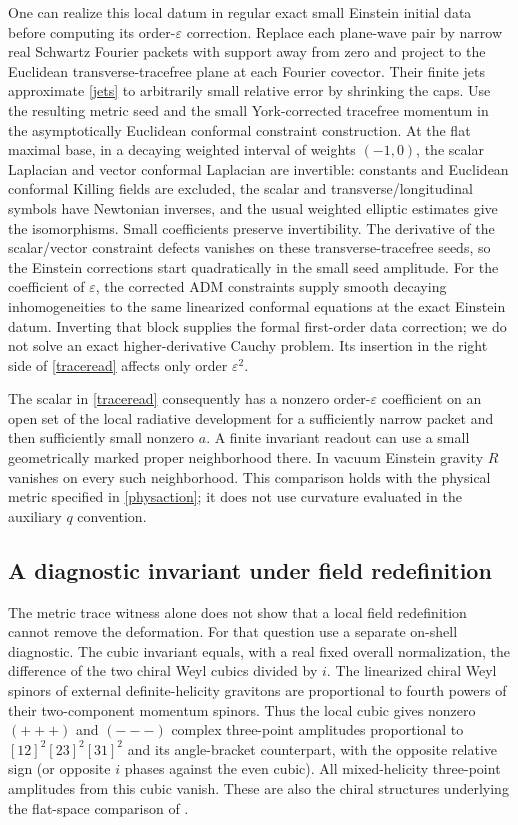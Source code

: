 \documentclass[11pt]{article}
\newcommand{\ep}{\varepsilon}
\begin{document}
One can realize this local datum in regular exact small Einstein initial data before computing its order-\(\ep\) correction. Replace each plane-wave pair by narrow real Schwartz Fourier packets with support away from zero and project to the Euclidean transverse-tracefree plane at each Fourier covector. Their finite jets approximate \eqref{jets} to arbitrarily small relative error by shrinking the caps. Use the resulting metric seed and the small York-corrected tracefree momentum in the asymptotically Euclidean conformal constraint construction. At the flat maximal base, in a decaying weighted interval of weights \((-1,0)\), the scalar Laplacian and vector conformal Laplacian are invertible: constants and Euclidean conformal Killing fields are excluded, the scalar and transverse/longitudinal symbols have Newtonian inverses, and the usual weighted elliptic estimates give the isomorphisms. Small coefficients preserve invertibility. The derivative of the scalar/vector constraint defects vanishes on these transverse-tracefree seeds, so the Einstein corrections start quadratically in the small seed amplitude. For the coefficient of \(\ep\), the corrected ADM constraints supply smooth decaying inhomogeneities to the same linearized conformal equations at the exact Einstein datum. Inverting that block supplies the formal first-order data correction; we do not solve an exact higher-derivative Cauchy problem. Its insertion in the right side of \eqref{traceread} affects only order \(\ep^2\).

The scalar in \eqref{traceread} consequently has a nonzero order-\(\ep\) coefficient on an open set of the local radiative development for a sufficiently narrow packet and then sufficiently small nonzero \(a\). A finite invariant readout can use a small geometrically marked proper neighborhood there. In vacuum Einstein gravity \(R\) vanishes on every such neighborhood. This comparison holds with the physical metric specified in \eqref{physaction}; it does not use curvature evaluated in the auxiliary \(q\) convention.

\subsection{A diagnostic invariant under field redefinition}
The metric trace witness alone does not show that a local field redefinition cannot remove the deformation. For that question use a separate on-shell diagnostic. The cubic invariant equals, with a real fixed overall normalization, the difference of the two chiral Weyl cubics divided by \(i\). The linearized chiral Weyl spinors of external definite-helicity gravitons are proportional to fourth powers of their two-component momentum spinors. Thus the local cubic gives nonzero \((+++)\) and \((---)\) complex three-point amplitudes proportional to \([12]^2[23]^2[31]^2\) and its angle-bracket counterpart, with the opposite relative sign (or opposite \(i\) phases against the even cubic). All mixed-helicity three-point amplitudes from this cubic vanish. These are also the chiral structures underlying the flat-space comparison of \cite{MP}.
\end{document}
